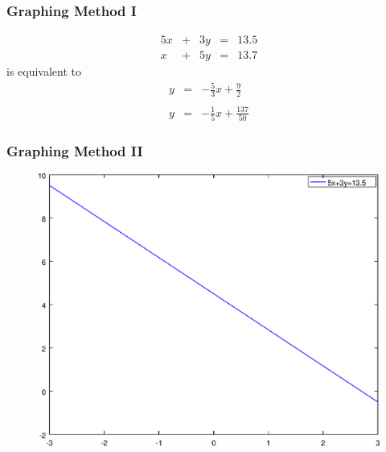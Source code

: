 \documentclass[xcolor=dvipsnames]{beamer}
\begin{document}
\begin{frame}
  \frametitle{Graphing Method I}
  \begin{equation}
    \label{eq:oamaiwei}
    \begin{array}{rcrcl}
      5x&+&3y&=&13.5 \\
      x&+&5y&=&13.7
    \end{array}
  \end{equation}
is equivalent to
  \begin{equation}
    \label{eq:kaiquaeb}
    \begin{array}{rcl}
      y&=&-\frac{5}{3}x+\frac{9}{2} \\
      && \\
      y&=&-\frac{1}{5}x+\frac{137}{50}
    \end{array}
  \end{equation}
\end{frame}

\begin{frame}
  \frametitle{Graphing Method II}
  \begin{figure}[h]
    \includegraphics[scale=.6]{./gm-03-SystemsEquations-01.eps}
  \end{figure}
\end{frame}
\end{document}
